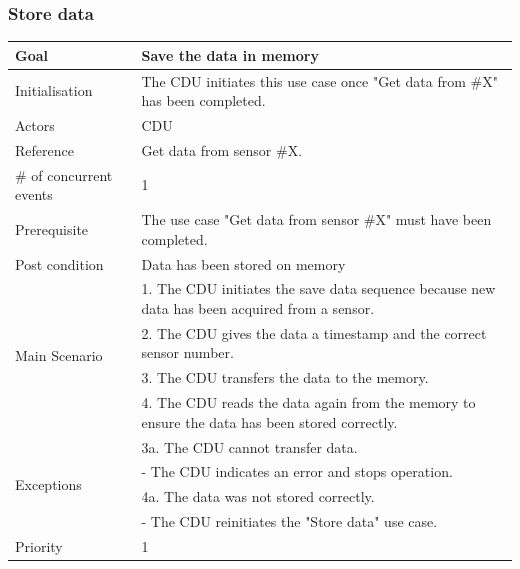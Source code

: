 \subsubsection{Store data}
\begin{table}[H]
	\centering
	\begin{tabular}{|l|p{10cm}|}
	\hline
	Goal 							& Save the data in memory \\ \hline
	Initialisation 					& The CDU initiates this use case once "Get data from \#X" has been completed. \\ \hline
	\multirow{1}{*}{Actors} 		& CDU \\ \hline
	Reference 						& Get data from sensor \#X. \\ \hline
	\# of concurrent events 		& 1 \\ \hline
	Prerequisite  					& The use case "Get data from sensor \#X" must have been completed. \\ \hline
	Post condition 					& Data has been stored on memory \\ \hline
	\multirow{4}{*}{Main Scenario} 	& 1. The CDU initiates the save data sequence because new data has been acquired from a sensor. \\
									& 2. The CDU gives the data a timestamp and the correct sensor number.\\
									& 3. The CDU transfers the data to the memory.\\ 
									& 4. The CDU reads the data again from the memory to ensure the data has been stored correctly. \\ \hline
	\multirow{4}{*}{Exceptions} & 3a. The CDU cannot transfer data. \\ 
								& - The CDU indicates an error and stops operation.\\											& 4a. The data was not stored correctly. \\
								& - The CDU reinitiates the "Store data" use case.\\\hline
	Priority					& 1\\\hline
	\end{tabular}
\end{table}


